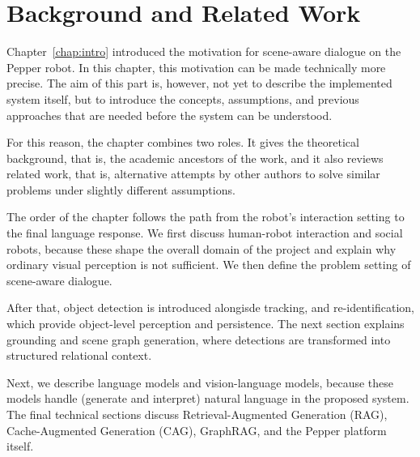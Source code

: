 \chapter{Background and Related Work}\label{chap:background}

Chapter~\ref{chap:intro} introduced the motivation for scene-aware dialogue on the Pepper robot. In this chapter, this motivation can be made technically more precise. The aim of this part is, however, not yet to describe the implemented system itself, but to introduce the concepts, assumptions, and previous approaches that are needed before the system can be understood.

For this reason, the chapter combines two roles. It gives the theoretical background, that is, the academic ancestors of the work, and it also reviews related work, that is, alternative attempts by other authors to solve similar problems under slightly different assumptions.

The order of the chapter follows the path from the robot's interaction setting to the final language response. We first discuss human-robot interaction and social robots, because these shape the overall domain of the project and explain why ordinary visual perception is not sufficient. We then define the problem setting of scene-aware dialogue.

After that, object detection is introduced alongisde tracking, and re-identification, which provide object-level perception and persistence. The next section explains grounding and scene graph generation, where detections are transformed into structured relational context.

Next, we describe language models and vision-language models, because these models handle (generate and interpret) natural language in the proposed system. The final technical sections discuss Retrieval-Augmented Generation (RAG), Cache-Augmented Generation (CAG), GraphRAG, and the Pepper platform itself.



